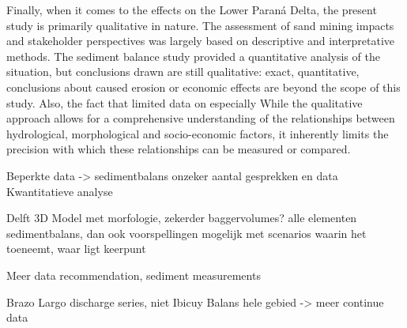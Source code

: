 Finally, when it comes to the effects on the Lower Paraná Delta, the present study is primarily qualitative in nature. The assessment of sand mining impacts and stakeholder perspectives was largely based on descriptive and interpretative methods. The sediment balance study provided a quantitative analysis of the situation, but conclusions drawn are still qualitative: exact, quantitative, conclusions about caused erosion or economic effects are beyond the scope of this study. Also, the fact that limited data on especially  While the qualitative approach allows for a comprehensive understanding of the relationships between hydrological, morphological and socio-economic factors, it inherently limits the precision with which these relationships can be measured or compared.



Beperkte data -> sedimentbalans onzeker aantal gesprekken en data
Kwantitatieve analyse

Delft 3D Model met morfologie, zekerder baggervolumes? alle elementen sedimentbalans, dan ook voorspellingen mogelijk met scenarios waarin het toeneemt, waar ligt keerpunt

Meer data recommendation, sediment measurements

Brazo Largo discharge series, niet Ibicuy
Balans hele gebied -> meer continue data



